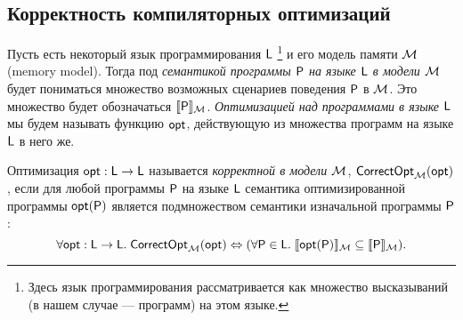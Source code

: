 \subsection{Корректность компиляторных оптимизаций}
Пусть есть некоторый язык программирования $\mathsf{L}$%
\footnote{Здесь язык программирования рассматривается как множество высказываний
(в нашем случае --- программ) на этом языке.}
и его модель памяти $\mathcal{M}$\label{acr:mm} (memory model).
Тогда под \emph{семантикой программы $\mathsf{P}$ на языке $\mathsf{L}$ в модели $\mathcal{M}$}
будет пониматься множество возможных сценариев поведения $\mathsf{P}$ в $\mathcal{M}$.
Это множество будет обозначаться $\llbracket \mathsf{P} \rrbracket_{\mathcal{M}}$.
\emph{Оптимизацией над программами в языке $\mathsf{L}$} мы будем называть функцию $\mathsf{opt}$, действующую из
множества программ на языке $\mathsf{L}$ в него же.
\begin{definition}
  Оптимизация $\mathsf{opt} : \mathsf{L} \rightarrow \mathsf{L}$ называется \emph{корректной в модели $\mathcal{M}$},
  $\mathsf{CorrectOpt}_{\mathcal{M}}(\mathsf{opt})$, если для любой программы $\mathsf{P}$ на языке $\mathsf{L}$
  семантика оптимизированной программы $\mathsf{opt}(\mathsf{P})$ является подмножеством семантики изначальной программы $\mathsf{P}$:
  \[\forall \mathsf{opt} : \mathsf{L} \rightarrow \mathsf{L}. \; \mathsf{CorrectOpt}_{\mathcal{M}}(\mathsf{opt}) \Leftrightarrow (\forall \mathsf{P} \in \mathsf{L}. \; \llbracket \mathsf{opt}(\mathsf{P}) \rrbracket_{\mathcal{M}} \subseteq \llbracket \mathsf{P} \rrbracket_{\mathcal{M}}). \]
\end{definition}


